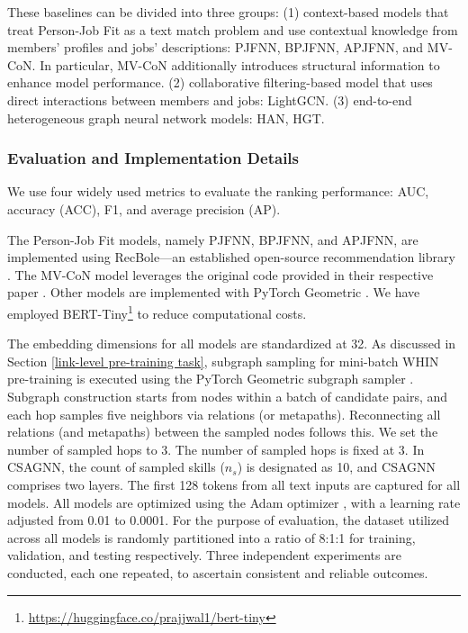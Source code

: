 These baselines can be divided into three groups: (1) context-based models that treat Person-Job Fit as a text match problem and use contextual knowledge from members' profiles and jobs' descriptions: PJFNN, BPJFNN, APJFNN, and MV-CoN. In particular, MV-CoN additionally introduces structural information to enhance model performance. (2) collaborative filtering-based model that uses direct interactions between members and jobs: LightGCN. (3) end-to-end heterogeneous graph neural network models: HAN, HGT.

\subsubsection{Evaluation and Implementation Details}
We use four widely used metrics to evaluate the ranking performance: AUC, accuracy (ACC), F1, and average precision (AP).

The Person-Job Fit models, namely PJFNN, BPJFNN, and APJFNN, are implemented using RecBole—an established open-source recommendation library \cite{zhao2021recbole}. The MV-CoN model leverages the original code provided in their respective paper \cite{bian2020learning}. Other models are implemented with PyTorch Geometric \cite{Fey/Lenssen/2019}. We have employed BERT-Tiny\footnote{\url{https://huggingface.co/prajjwal1/bert-tiny}} to reduce computational costs.

The embedding dimensions for all models are standardized at 32. As discussed in Section \ref{link-level pre-training task}, subgraph sampling for mini-batch WHIN pre-training is executed using the PyTorch Geometric subgraph sampler \cite{Fey/Lenssen/2019}. Subgraph construction starts from nodes within a batch of candidate pairs, and each hop samples five neighbors via relations (or metapaths). Reconnecting all relations (and metapaths) between the sampled nodes follows this. We set the number of sampled hops to 3. The number of sampled hops is fixed at 3. In CSAGNN, the count of sampled skills ($n_s$) is designated as 10, and CSAGNN comprises two layers. The first 128 tokens from all text inputs are captured for all models. All models are optimized using the Adam optimizer \cite{kingma2014adam}, with a learning rate adjusted from 0.01 to 0.0001. For the purpose of evaluation, the dataset utilized across all models is randomly partitioned into a ratio of 8:1:1 for training, validation, and testing respectively. Three independent experiments are conducted, each one repeated, to ascertain consistent and reliable outcomes.

